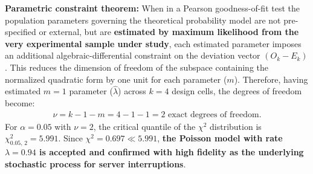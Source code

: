 \begin{solproblema}
\begin{enumerate}
		\textbf{Parametric constraint theorem:} When in a Pearson goodness-of-fit test the population parameters governing the theoretical probability model are not pre-specified or external, but are \textbf{estimated by maximum likelihood from the very experimental sample under study}, each estimated parameter imposes an additional algebraic-differential constraint on the deviation vector $(O_k - E_k)$. This reduces the dimension of freedom of the subspace containing the normalized quadratic form by one unit for each parameter ($m$).
		Therefore, having estimated $m = 1$ parameter ($\hat{\lambda}$) across $k = 4$ design cells, the degrees of freedom become:
		\begin{align}
			\nu = k - 1 - m = 4 - 1 - 1 = 2 \text{ exact degrees of freedom.}
		\end{align}
		For $\alpha = 0.05$ with $\nu = 2$, the critical quantile of the $\chi^2$ distribution is $\chi^2_{0.05, \, 2} = 5.991$.
		Since $\chi^2 = 0.697 \ll 5.991$, \textbf{the Poisson model with rate $\lambda = 0.94$ is accepted and confirmed with high fidelity as the underlying stochastic process for server interruptions}.
	\end{enumerate}
\end{solproblema}

